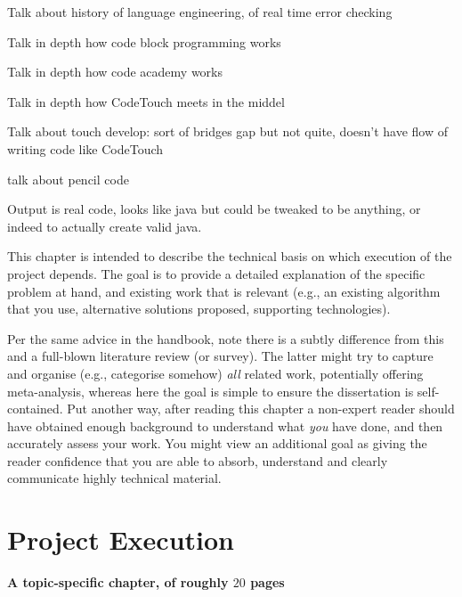 \documentclass[ %
                    author={Jonathan Rankin},
                supervisor={Dr. David May, Dr. Ian Holyer},
                    degree={MEng},
                     title={CodeTouch},
                  subtitle={A Revolutionary Way To Program Real Code On Touch Screen Devices},
                      type={enterprise},
                      year={2015 } ]{dissertation}
\begin{document}
Talk about history of language engineering, of real time error checking


Talk in depth how code block programming works

Talk in depth how code academy works

Talk in depth how CodeTouch meets in the middel

Talk about touch develop: sort of bridges gap but not quite, doesn't have flow of writing code like CodeTouch

talk about pencil code

Output is real code, looks like java but could be tweaked to be anything, or indeed to actually create valid java.

\noindent
This chapter is intended to describe the technical basis on which execution
of the project depends.  The goal is to provide a detailed explanation of
the specific problem at hand, and existing work that is relevant (e.g., an
existing algorithm that you use, alternative solutions proposed, supporting
technologies).  

Per the same advice in the handbook, note there is a subtly difference from
this and a full-blown literature review (or survey).  The latter might try
to capture and organise (e.g., categorise somehow) {\em all} related work,
potentially offering meta-analysis, whereas here the goal is simple to
ensure the dissertation is self-contained.  Put another way, after reading 
this chapter a non-expert reader should have obtained enough background to 
understand what {\em you} have done, and then accurately assess your work.
You might view an additional goal as giving the reader confidence that you 
are able to absorb, understand and clearly communicate highly technical 
material.


\chapter{Project Execution}
\label{chap:execution}

{\bf A topic-specific chapter, of roughly $20$ pages} 
\vspace{1cm} 
\end{document}
